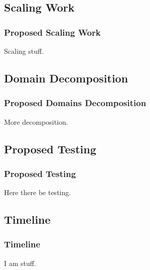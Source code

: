 \documentclass[compress,xcolor=table]{beamer}
\begin{document}
\subsection[Scaling]{Scaling Work}
\begin{frame}
\frametitle{Proposed Scaling Work}

Scaling stuff.

\end{frame}
\subsection[Domain Decomposition]{Domain Decomposition}
\begin{frame}
\frametitle{Proposed Domains Decomposition}

More decomposition.

\end{frame}
\subsection[Testing]{Proposed Testing}
\begin{frame}
\frametitle{Proposed Testing}

Here there be testing.

\end{frame}
\subsection[Timeline]{Timeline}
\begin{frame}
\frametitle{Timeline}

I am stuff.

\end{frame}
\end{document}
